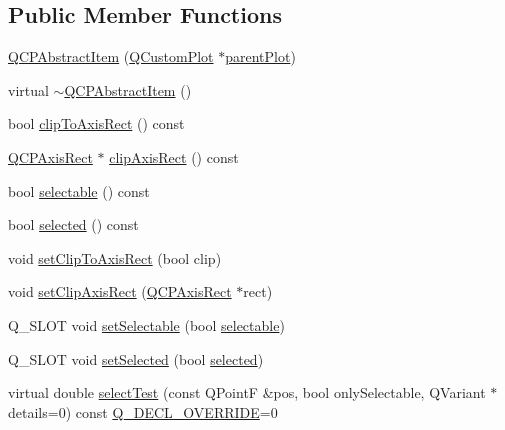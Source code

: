 \subsection*{Public Member Functions}
\begin{DoxyCompactItemize}
\item 
\hyperlink{class_q_c_p_abstract_item_a9922507d8b4503a1fe1ed0b1030e23b6}{Q\+C\+P\+Abstract\+Item} (\hyperlink{class_q_custom_plot}{Q\+Custom\+Plot} $\ast$\hyperlink{class_q_c_p_layerable_a473edb813a4c1929d6b6a8fe3ff3faf7}{parent\+Plot})
\item 
virtual \hyperlink{class_q_c_p_abstract_item_a375bd1b7d3218b04a6ff7ff06fff917c}{$\sim$\+Q\+C\+P\+Abstract\+Item} ()
\item 
bool \hyperlink{class_q_c_p_abstract_item_a42715ad5f3d7fca6854025fa5636f436}{clip\+To\+Axis\+Rect} () const
\item 
\hyperlink{class_q_c_p_axis_rect}{Q\+C\+P\+Axis\+Rect} $\ast$ \hyperlink{class_q_c_p_abstract_item_ae162314efd3fe1a6d4df11da1d275d52}{clip\+Axis\+Rect} () const
\item 
bool \hyperlink{class_q_c_p_abstract_item_ae29aa489767352b40c4aaa7ea50c5582}{selectable} () const
\item 
bool \hyperlink{class_q_c_p_abstract_item_aa069fba320a13639f119f82ad29ead96}{selected} () const
\item 
void \hyperlink{class_q_c_p_abstract_item_a39e05b9d4176b9accafc746d16ca6a06}{set\+Clip\+To\+Axis\+Rect} (bool clip)
\item 
void \hyperlink{class_q_c_p_abstract_item_a7dc75fcbcd10206fe0b75d757ea7a347}{set\+Clip\+Axis\+Rect} (\hyperlink{class_q_c_p_axis_rect}{Q\+C\+P\+Axis\+Rect} $\ast$rect)
\item 
Q\+\_\+\+S\+L\+OT void \hyperlink{class_q_c_p_abstract_item_a8a8e32a55bc478b849756a78c2d87fd2}{set\+Selectable} (bool \hyperlink{class_q_c_p_abstract_item_ae29aa489767352b40c4aaa7ea50c5582}{selectable})
\item 
Q\+\_\+\+S\+L\+OT void \hyperlink{class_q_c_p_abstract_item_a203de94ad586cc44d16c9565f49d3378}{set\+Selected} (bool \hyperlink{class_q_c_p_abstract_item_aa069fba320a13639f119f82ad29ead96}{selected})
\item 
virtual double \hyperlink{class_q_c_p_abstract_item_ae41d0349d68bb802c49104afd100ba2a}{select\+Test} (const Q\+PointF \&pos, bool only\+Selectable, Q\+Variant $\ast$details=0) const \hyperlink{qcustomplot_8h_a42cc5eaeb25b85f8b52d2a4b94c56f55}{Q\+\_\+\+D\+E\+C\+L\+\_\+\+O\+V\+E\+R\+R\+I\+DE}=0
\item 

\end{DoxyCompactItemize}
